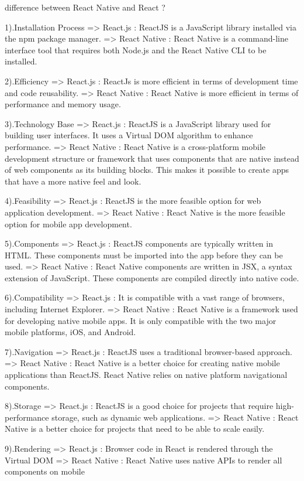 difference between React Native and React ?

1).Installation Process	
=> React.js	: ReactJS is a JavaScript library installed via the npm package manager.	
=> React Native : React Native is a command-line interface tool that requires both Node.js and the React Native CLI to be installed.

2).Efficiency	
=> React.js	: ReactJs is more efficient in terms of development time and code reusability.	
=> React Native : React Native is more efficient in terms of performance and memory usage.

3).Technology Base	
=> React.js	: ReactJS is a JavaScript library used for building user interfaces. It uses a Virtual DOM algorithm to enhance performance.	
=> React Native : React Native is a cross-platform mobile development structure or framework that uses components that are native instead of web components as its building blocks. This makes it possible to create apps that have a more native feel and look.

4).Feasibility
=> React.js	: ReactJS is the more feasible option for web application development.	
=> React Native : React Native is the more feasible option for mobile app development.

5).Components	
=> React.js	: ReactJS components are typically written in HTML. These components must be imported into the app before they can be used.	
=> React Native : React Native components are written in JSX, a syntax extension of JavaScript. These components are compiled directly into native code.

6).Compatibility
=> React.js	: It is compatible with a vast range of browsers, including Internet Explorer.	
=> React Native : React Native is a framework used for developing native mobile apps. It is only compatible with the two major mobile platforms, iOS, and Android.

7).Navigation
=> React.js	: ReactJS uses a traditional browser-based approach.	
=> React Native : React Native is a better choice for creating native mobile applications than ReactJS. React Native relies on native platform navigational components.

8).Storage
=> React.js	: ReactJS is a good choice for projects that require high-performance storage, such as dynamic web applications.	
=> React Native : React Native is a better choice for projects that need to be able to scale easily.

9).Rendering	
=> React.js	: Browser code in React is rendered through the Virtual DOM	
=> React Native : React Native uses native APIs to render all components on mobile

